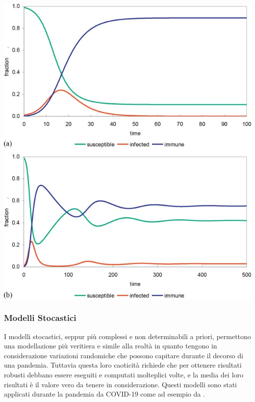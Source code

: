 \begin{minipage}{\linewidth}
    \centering
    \includegraphics[width=\textwidth]{img/3-s2.0-B9780128012383988378-f98837-02-9780128012383.jpg}
    \label{fig:Endemic_equilibrium}
\end{minipage}

\subsubsection{Modelli Stocastici}
I modelli stocastici, seppur più complessi e non determinabili 
a priori, permettono una modellazione più veritiera e 
simile alla realtà in quanto tengono in considerazione 
variazioni randomiche che possono capitare durante il 
decorso di una pandemia. Tuttavia questa loro caoticità 
richiede che per ottenere risultati robusti debbano essere 
eseguiti e computati molteplici volte, e la media dei loro 
risultati è il valore vero da tenere in considerazione. 
Questi modelli sono stati applicati durante la pandemia da COVID-19 
come ad esempio da \cite{ijerph17103535}. 

